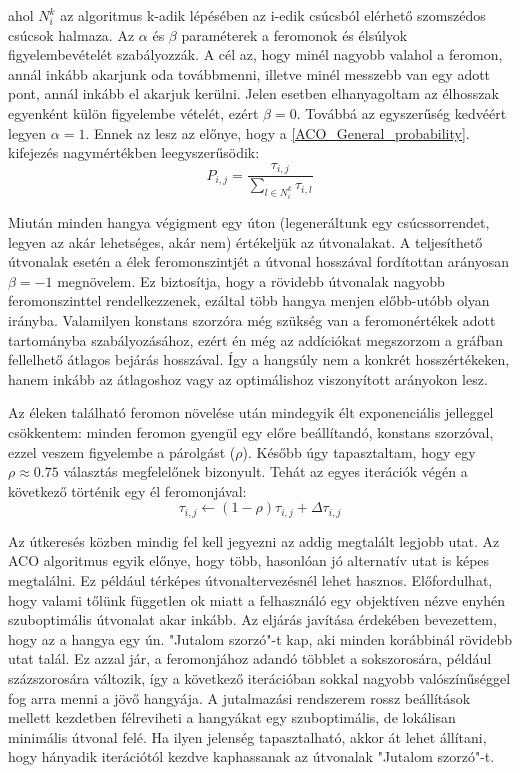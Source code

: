 ahol \(N_i^k \) az algoritmus k-adik lépésében az i-edik csúcsból elérhető szomszédos csúcsok halmaza. Az \(\alpha\) és \(\beta\) paraméterek a feromonok és élsúlyok figyelembevételét szabályozzák. A cél az, hogy minél nagyobb valahol a feromon, annál inkább akarjunk oda továbbmenni, illetve minél messzebb van egy adott pont, annál inkább el akarjuk kerülni. Jelen esetben elhanyagoltam az élhosszak egyenként külön figyelembe vételét, ezért \(\beta = 0\). Továbbá az egyszerűség kedvéért legyen \(\alpha = 1\). Ennek az lesz az előnye, hogy a \ref{ACO_General_probability}. kifejezés nagymértékben leegyszerűsödik:
\begin{equation}
	P_{i,j} = \frac{\tau_{i,j}}{\sum_{l \in N_i^k}\tau_{i,l}}
	\label{ACO_My_probability}
\end{equation}

Miután minden hangya végigment egy úton (legeneráltunk egy csúcssorrendet, legyen az akár lehetséges, akár nem) értékeljük az útvonalakat. A teljesíthető útvonalak esetén a élek feromonszintjét a útvonal hosszával fordítottan arányosan \(\beta = -1\) megnövelem. Ez biztosítja, hogy a rövidebb útvonalak nagyobb feromonszinttel rendelkezzenek, ezáltal több hangya menjen előbb-utóbb olyan irányba. Valamilyen konstans szorzóra még szükség van a feromonértékek adott tartományba szabályozásához, ezért én még az addíciókat megszorzom a gráfban fellelhető átlagos bejárás hosszával. Így a hangsúly nem a konkrét hosszértékeken, hanem inkább az átlagoshoz vagy az optimálishoz viszonyított arányokon lesz.

Az éleken található feromon növelése után mindegyik élt exponenciális jelleggel csökkentem: minden feromon gyengül egy előre beállítandó, konstans szorzóval, ezzel veszem figyelembe a párolgást (\(\rho\)). Később úgy tapasztaltam, hogy egy \(\rho \approx 0.75\) választás megfelelőnek bizonyult. Tehát az egyes iterációk végén a következő történik egy él feromonjával:
\[ \tau_{i,j} \leftarrow (1-\rho)\tau_{i,j} + \Delta\tau_{i,j} \]

Az útkeresés közben mindig fel kell jegyezni az addig megtalált legjobb utat. Az ACO algoritmus egyik előnye, hogy több, hasonlóan jó alternatív utat is képes megtalálni. Ez például térképes útvonaltervezésnél lehet hasznos. Előfordulhat, hogy valami tőlünk független ok miatt a felhasználó egy objektíven nézve enyhén szuboptimális útvonalat akar inkább. Az eljárás javítása érdekében bevezettem, hogy az a hangya egy ún. "Jutalom szorzó"-t kap, aki minden korábbinál rövidebb utat talál. Ez azzal jár, a feromonjához adandó többlet a sokszorosára, például százszorosára változik, így a következő iterációban sokkal nagyobb valószínűséggel fog arra menni a jövő hangyája. A jutalmazási rendszerem rossz beállítások mellett kezdetben félreviheti a hangyákat egy szuboptimális, de lokálisan minimális útvonal felé. Ha ilyen jelenség tapasztalható, akkor át lehet állítani, hogy hányadik iterációtól kezdve kaphassanak az útvonalak "Jutalom szorzó"-t.

